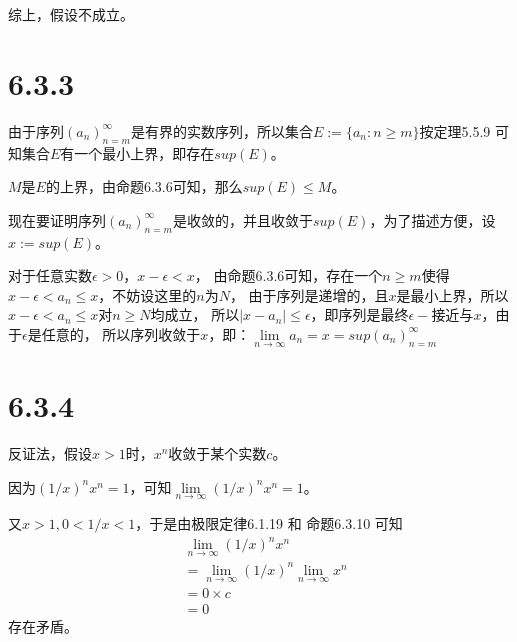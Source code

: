 \documentclass{article}
\theoremstyle{mystyle}
\begin{document}
综上，假设不成立。

\section*{6.3.3}

由于序列$(a_n)_{n=m}^\infty$是有界的实数序列，所以集合$E := \{a_n : n \geq m\}$按定理5.5.9
可知集合$E$有一个最小上界，即存在$sup(E)$。

$M$是$E$的上界，由命题6.3.6可知，那么$sup(E) \leq M$。

现在要证明序列$(a_n)_{n=m}^\infty$是收敛的，并且收敛于$sup(E)$，为了描述方便，设$x:=sup(E)$。

对于任意实数$\epsilon > 0$，$x - \epsilon < x$，
由命题6.3.6可知，存在一个$n \geq m$使得$x-\epsilon < a_n \leq x$，不妨设这里的$n$为$N$，
由于序列是递增的，且$x$是最小上界，所以$x-\epsilon < a_n \leq x$对$n \geq N$均成立，
所以$|x - a_n| \leq \epsilon$，即序列是最终$\epsilon -$接近与$x$，由于$\epsilon$是任意的，
所以序列收敛于$x$，即：$\lim\limits_{n \to \infty} a_n = x = sup(a_n)_{n=m}^\infty$

\section*{6.3.4}

反证法，假设$x > 1$时，$x^n$收敛于某个实数$c$。

因为$(1/x)^nx^n =1$，可知$\lim\limits_{n \to \infty} (1/x)^nx^n = 1$。

又$x > 1, 0 < 1/x < 1$，于是由极限定律6.1.19 和 命题6.3.10 可知
\begin{align*}
   & \lim\limits_{n \to \infty} (1/x)^nx^n                               \\
   & = \lim\limits_{n \to \infty} (1/x)^n \lim\limits_{n \to \infty} x^n \\
   & = 0 \times c                                                        \\
   & = 0
\end{align*}
存在矛盾。
\end{document}
